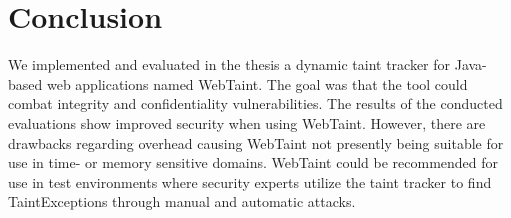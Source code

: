 \chapter{Conclusion}
\label{Conclusion}
We implemented and evaluated in the thesis a dynamic taint tracker for Java-based web applications named WebTaint. The goal was that the tool could combat integrity and confidentiality vulnerabilities. The results of the conducted evaluations show improved security when using WebTaint. However, there are drawbacks regarding overhead causing WebTaint not presently being suitable for use in time- or memory sensitive domains. WebTaint could be recommended for use in test environments where security experts utilize the taint tracker to find TaintExceptions through manual and automatic attacks.
